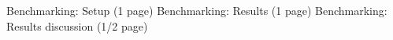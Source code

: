 Benchmarking: Setup (1 page)
Benchmarking: Results (1 page)
Benchmarking: Results discussion (1/2 page)
